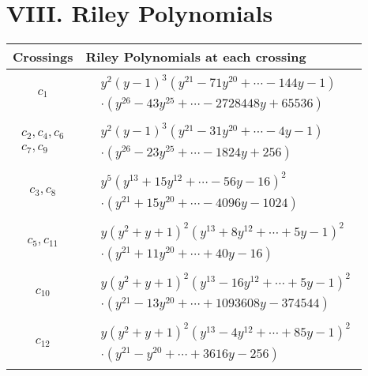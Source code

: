 \documentclass[1p]{elsarticle_modified}
\theoremstyle{definition}
\begin{document}
\centering \section*{ VIII. Riley Polynomials}
\begin{tabular}{m{50pt}|m{274pt}}
Crossings & \hspace{64pt}Riley Polynomials at each crossing \\
\hline $$\begin{aligned}c_{1}\end{aligned}$$&$\begin{aligned}
&y^2(y-1)^3(y^{21}-71 y^{20}+\cdots-144 y-1)\\
&\cdot(y^{26}-43 y^{25}+\cdots-2728448 y+65536)
\end{aligned}$\\
\hline $$\begin{aligned}c_{2},c_{4},c_{6}\\c_{7},c_{9}\end{aligned}$$&$\begin{aligned}
&y^2(y-1)^3(y^{21}-31 y^{20}+\cdots-4 y-1)\\
&\cdot(y^{26}-23 y^{25}+\cdots-1824 y+256)
\end{aligned}$\\
\hline $$\begin{aligned}c_{3},c_{8}\end{aligned}$$&$\begin{aligned}
&y^5(y^{13}+15 y^{12}+\cdots-56 y-16)^{2}\\
&\cdot(y^{21}+15 y^{20}+\cdots-4096 y-1024)
\end{aligned}$\\
\hline $$\begin{aligned}c_{5},c_{11}\end{aligned}$$&$\begin{aligned}
&y(y^2+y+1)^2(y^{13}+8 y^{12}+\cdots+5 y-1)^{2}\\
&\cdot(y^{21}+11 y^{20}+\cdots+40 y-16)
\end{aligned}$\\
\hline $$\begin{aligned}c_{10}\end{aligned}$$&$\begin{aligned}
&y(y^2+y+1)^2(y^{13}-16 y^{12}+\cdots+5 y-1)^{2}\\
&\cdot(y^{21}-13 y^{20}+\cdots+1093608 y-374544)
\end{aligned}$\\
\hline $$\begin{aligned}c_{12}\end{aligned}$$&$\begin{aligned}
&y(y^2+y+1)^2(y^{13}-4 y^{12}+\cdots+85 y-1)^{2}\\
&\cdot(y^{21}- y^{20}+\cdots+3616 y-256)
\end{aligned}$\\
\hline
\end{tabular}
\vskip 2pc
\end{document}
